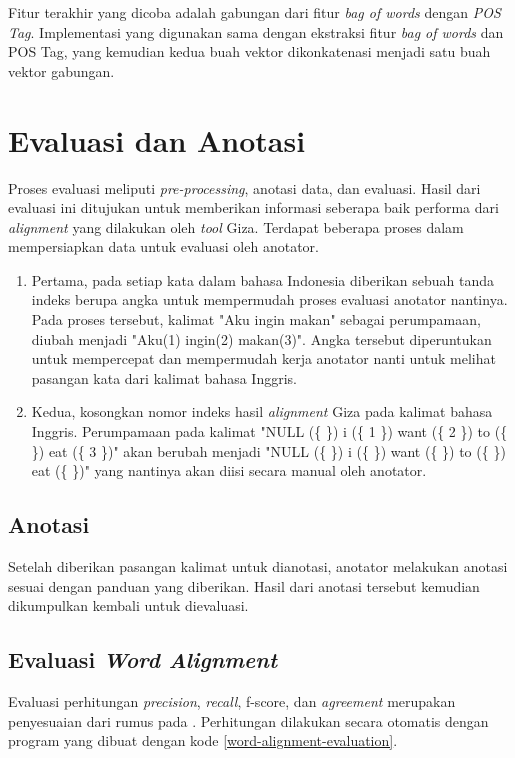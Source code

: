 Fitur terakhir yang dicoba adalah gabungan dari fitur \textit{bag of words} dengan \textit{POS Tag}. Implementasi yang digunakan sama dengan ekstraksi fitur \textit{bag of words} dan POS Tag, yang kemudian kedua buah vektor dikonkatenasi menjadi satu buah vektor gabungan.

\section{Evaluasi dan Anotasi}

Proses evaluasi meliputi \textit{pre-processing}, anotasi data, dan evaluasi. Hasil dari evaluasi ini ditujukan untuk memberikan informasi seberapa baik performa dari \textit{alignment} yang dilakukan oleh \textit{tool} Giza. Terdapat beberapa proses dalam mempersiapkan data untuk evaluasi oleh anotator.
\begin{enumerate}
	\item Pertama, pada setiap kata dalam bahasa Indonesia diberikan sebuah tanda indeks berupa angka untuk mempermudah proses evaluasi anotator nantinya. Pada proses tersebut, kalimat "Aku ingin makan" sebagai perumpamaan, diubah menjadi "Aku(1) ingin(2) makan(3)". Angka tersebut diperuntukan untuk mempercepat dan mempermudah kerja anotator nanti untuk melihat pasangan kata dari kalimat bahasa Inggris.
	\item Kedua, kosongkan nomor indeks hasil \textit{alignment} Giza pada kalimat bahasa Inggris. Perumpamaan pada kalimat "NULL (\{  \}) i (\{ 1 \}) want (\{ 2 \}) to (\{  \}) eat (\{ 3 \})" akan berubah menjadi  "NULL (\{  \}) i (\{  \}) want (\{   \}) to (\{  \}) eat (\{  \})" yang nantinya akan diisi secara manual oleh anotator.
\end{enumerate}

\subsection{Anotasi}
Setelah diberikan pasangan kalimat untuk dianotasi, anotator melakukan anotasi sesuai dengan panduan yang diberikan. Hasil dari anotasi tersebut kemudian dikumpulkan kembali untuk dievaluasi.

\subsection{Evaluasi \textit{Word Alignment}}
Evaluasi perhitungan \textit{precision}, \textit{recall}, f-score, dan \textit{agreement} merupakan penyesuaian dari rumus pada \citep{mihalcea2003evaluation}. Perhitungan dilakukan secara otomatis dengan program yang dibuat dengan kode \ref{word-alignment-evaluation}.

